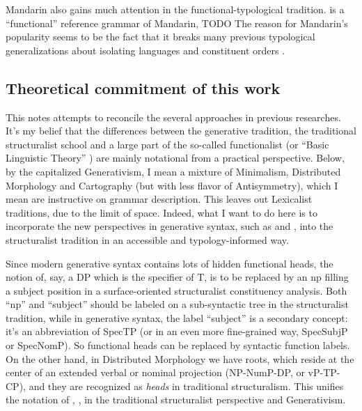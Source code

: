 \documentclass[UTF8, a4paper, oneside, scheme=plain]{ctexrep}
\newcommand*{\citechap}[1]{chap.~{#1}}
\newcommand*{\term}[1]{\emph{#1}}
\begin{document}
Mandarin also gains much attention in the functional-typological tradition.
\citet{li1989mandarin} is a ``functional'' reference grammar of Mandarin, TODO
The reason for Mandarin's popularity seems to be the fact that 
it breaks many previous typological generalizations about isolating languages and constituent orders
\citep[\citechap{8}]{paul2014new}.

\subsection{Theoretical commitment of this work}\label{sec:theory}

This notes attempts to reconcile the several approaches in previous researches.
It's my belief that the differences between the generative tradition, 
the traditional structuralist school 
and a large part of the so-called functionalist 
(or ``Basic Linguistic Theory'' \citep{dixon2009basic}) 
are mainly notational from a practical perspective.
Below, by the capitalized Generativism,
I mean a mixture of Minimalism, Distributed Morphology and Cartography
(but with less flavor of Antisymmetry),
which I mean are instructive on grammar description.
This leaves out Lexicalist traditions, 
due to the limit of space.
Indeed, what I want to do here 
is to incorporate the new perspectives in generative syntax, 
such as \cite{paul2014new} and \cite{paul2008serial},
into the structuralist tradition
in an accessible and typology-informed way.

Since modern generative syntax contains lots of hidden functional heads,
the notion of, say, a DP which is the specifier of T,
is to be replaced by an \acs{np} filling a subject position 
in a surface-oriented structuralist constituency analysis. 
Both ``\acs{np}'' and ``subject'' should be labeled on a sub-syntactic tree
in the structuralist tradition,
while in generative syntax,
the label ``subject'' is a secondary concept:
it's an abbreviation of SpecTP (or in an even more fine-grained way, SpecSubjP or SpecNomP).
So functional heads can be replaced by syntactic function labels.
On the other hand,
in Distributed Morphology we have roots,
which reside at the center of an extended verbal or nominal projection
(NP-NumP-DP, or vP-TP-CP),
and they are recognized as \term{heads} in traditional structuralism.
This unifies the notation of
\citet{cgel}, \citet{chao1965grammar}, \citet{zhudexigrammar}
in the traditional structuralist perspective
and Generativism.
\end{document}
